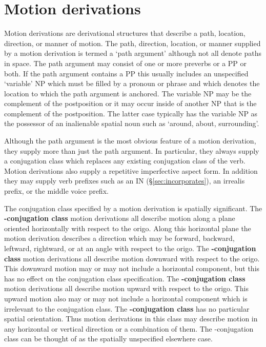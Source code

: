 
\clearpage
\section{Motion derivations}\label{sec:motion-derivations}

\begin{multicols}{2}
\noindent
Motion derivations are derivational structures that describe a path, location, direction, or manner of motion.
The path, direction, location, or manner supplied by a motion derivation is termed a ‘path argument’ although not all denote paths in space.
The path argument may consist of one or more preverbs or a PP or both.
If the path argument contains a PP this usually includes an unspecified ‘variable’ NP which must be filled by a pronoun or phrase and which denotes the location to which the path argument is anchored.
The variable NP may be the complement of the postposition or it may occur inside of another NP that is the complement of the postposition.
The latter case typically has the variable NP as the possessor of an inalienable spatial noun such as  ‘around, about, surrounding’.

Although the path argument is the most obvious feature of a motion derivation, they supply more than just the path argument.
In particular, they always supply a conjugation class which replaces any existing conjugation class of the verb.
Motion derivations also supply a repetitive imperfective aspect form.
In addition they may supply verb prefixes such as an IN (§\ref{sec:incorporates}), an irrealis prefix, or the middle voice  prefix.

The conjugation class specified by a motion derivation is spatially significant.
The \textbf{-conjugation class} motion derivations all describe motion along a plane oriented horizontally with respect to the origo.
Along this horizontal plane the motion derivation describes a direction which may be forward, backward, leftward, rightward, or at an angle with respect to the origo.
The \textbf{-conjugation class} motion derivations all describe motion downward with respect to the origo.
This downward motion may or may not include a horizontal component, but this has no effect on the conjugation class specification.
The \textbf{-conjugation class} motion derivations all describe motion upward with respect to the origo.
This upward motion also may or may not include a horizontal component which is irrelevant to the conjugation class.
The \textbf{-conjugation class} has no particular spatial orientation.
Thus motion derivations in this class may describe motion in any horizontal or vertical direction or a combination of them.
The -conjugation class can be thought of as the spatially unspecified elsewhere case.




\end{multicols}

